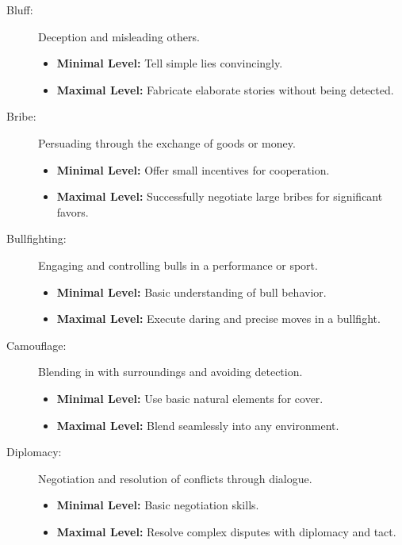 \begin{description}
    \item[Bluff:] Deception and misleading others.
        \begin{itemize}
            \item \textbf{Minimal Level:} Tell simple lies convincingly.
            \item \textbf{Maximal Level:} Fabricate elaborate stories without being detected.
        \end{itemize}

    \item[Bribe:] Persuading through the exchange of goods or money.
        \begin{itemize}
            \item \textbf{Minimal Level:} Offer small incentives for cooperation.
            \item \textbf{Maximal Level:} Successfully negotiate large bribes for significant favors.
        \end{itemize}

    \item[Bullfighting:] Engaging and controlling bulls in a performance or sport.
        \begin{itemize}
            \item \textbf{Minimal Level:} Basic understanding of bull behavior.
            \item \textbf{Maximal Level:} Execute daring and precise moves in a bullfight.
        \end{itemize}



    \item[Camouflage:] Blending in with surroundings and avoiding detection.
        \begin{itemize}
            \item \textbf{Minimal Level:} Use basic natural elements for cover.
            \item \textbf{Maximal Level:} Blend seamlessly into any environment.
        \end{itemize}

    \item[Diplomacy:] Negotiation and resolution of conflicts through dialogue.
        \begin{itemize}
            \item \textbf{Minimal Level:} Basic negotiation skills.
            \item \textbf{Maximal Level:} Resolve complex disputes with diplomacy and tact.
        \end{itemize}


\end{description}
